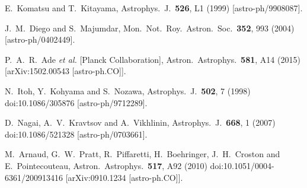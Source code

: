 \documentclass[aps,twocolumn,floats,prd,nofootinbib,10pt,floatfix]{revtex4-1}
\begin{document}
\begin{thebibliography}{99}
  E.~Komatsu and T.~Kitayama,
  Astrophys.\ J.\  {\bf 526}, L1 (1999)
  [astro-ph/9908087].


  J.~M.~Diego and S.~Majumdar,
  Mon.\ Not.\ Roy.\ Astron.\ Soc.\  {\bf 352}, 993 (2004)
  [astro-ph/0402449].


  P.~A.~R.~Ade {\it et al.} [Planck Collaboration],
  Astron.\ Astrophys.\  {\bf 581}, A14 (2015)
  [arXiv:1502.00543 [astro-ph.CO]].

  N.~Itoh, Y.~Kohyama and S.~Nozawa,
  Astrophys.\ J.\  {\bf 502}, 7 (1998)
  doi:10.1086/305876
  [astro-ph/9712289].

  D.~Nagai, A.~V.~Kravtsov and A.~Vikhlinin,
  Astrophys.\ J.\  {\bf 668}, 1 (2007)
  doi:10.1086/521328
  [astro-ph/0703661].

  M.~Arnaud, G.~W.~Pratt, R.~Piffaretti, H.~Boehringer, J.~H.~Croston and E.~Pointecouteau,
  Astron.\ Astrophys.\  {\bf 517}, A92 (2010)
  doi:10.1051/0004-6361/200913416
  [arXiv:0910.1234 [astro-ph.CO]].


\end{thebibliography}
\end{document}

